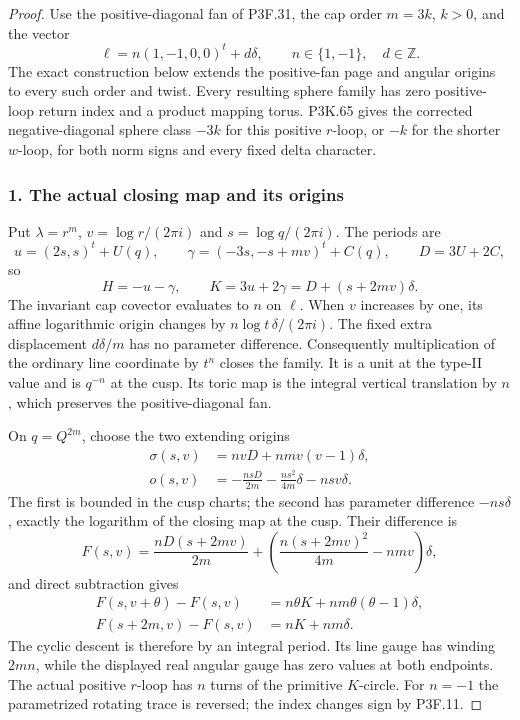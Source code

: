 \begin{proof}
Use the positive-diagonal fan of P3F.31, the cap order \(m=3k\), \(k>0\), and the vector \[
 \ell=n(1,-1,0,0)^t+d\delta,\qquad n\in\{1,-1\},\quad d\in\mathbb Z.
\] The exact construction below extends the positive-fan page and angular origins to every such order and twist. Every resulting sphere family has zero positive-loop return index and a product mapping torus. P3K.65 gives the corrected negative-diagonal sphere class \(-3k\) for this positive \(r\)-loop, or \(-k\) for the shorter \(w\)-loop, for both norm signs and every fixed delta character.

\subsubsection{1. The actual closing map and its origins}\label{the-actual-closing-map-and-its-origins}

Put \(\lambda=r^m\), \(v=\log r/(2\pi i)\) and \(s=\log q/(2\pi i)\). The periods are \[
 u=(2s,s)^t+U(q),\qquad
 \gamma=(-3s,-s+mv)^t+C(q),\qquad D=3U+2C,
\] so \[
 H=-u-\gamma,\qquad K=3u+2\gamma=D+(s+2mv)\delta.
\] The invariant cap covector evaluates to \(n\) on \(\ell\). When \(v\) increases by one, its affine logarithmic origin changes by \(n\log t\,\delta/(2\pi i)\). The fixed extra displacement \(d\delta/m\) has no parameter difference. Consequently multiplication of the ordinary line coordinate by \(t^n\) closes the family. It is a unit at the type-II value and is \(q^{-n}\) at the cusp. Its toric map is the integral vertical translation by \(n\), which preserves the positive-diagonal fan.

On \(q=Q^{2m}\), choose the two extending origins \[
 \begin{aligned}
 \sigma(s,v)&=nvD+nmv(v-1)\delta,\\
 o(s,v)&=-\frac{nsD}{2m}
          -\frac{ns^2}{4m}\delta-nsv\delta.
 \end{aligned}
\] The first is bounded in the cusp charts; the second has parameter difference \(-ns\delta\), exactly the logarithm of the closing map at the cusp. Their difference is \[
 F(s,v)=\frac{nD(s+2mv)}{2m}
       +\left(\frac{n(s+2mv)^2}{4m}-nmv\right)\delta,
\] and direct subtraction gives \[
 \begin{aligned}
 F(s,v+\theta)-F(s,v)
    &=n\theta K+nm\theta(\theta-1)\delta,\\
 F(s+2m,v)-F(s,v)&=nK+nm\delta.
 \end{aligned}
\] The cyclic descent is therefore by an integral period. Its line gauge has winding \(2mn\), while the displayed real angular gauge has zero values at both endpoints. The actual positive \(r\)-loop has \(n\) turns of the primitive \(K\)-circle. For \(n=-1\) the parametrized rotating trace is reversed; the index changes sign by P3F.11.


\end{proof}
